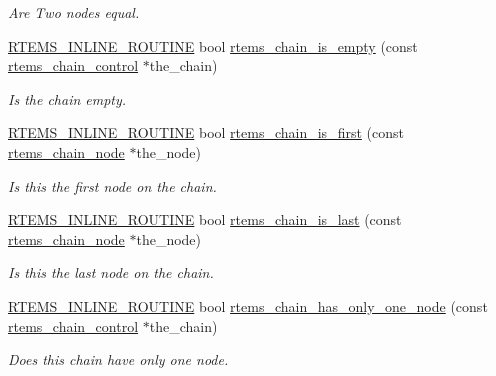\begin{DoxyCompactItemize}
\begin{DoxyCompactList}\small\item\em Are Two nodes equal. \end{DoxyCompactList}\item 
\mbox{\hyperlink{group__RTEMSScoreBaseDefs_gac216239df231d5dbd15e3520b0b9313f}{R\+T\+E\+M\+S\+\_\+\+I\+N\+L\+I\+N\+E\+\_\+\+R\+O\+U\+T\+I\+NE}} bool \mbox{\hyperlink{group__ClassicChains_ga82c37408681422fcdf19b0cdf4d96332}{rtems\+\_\+chain\+\_\+is\+\_\+empty}} (const \mbox{\hyperlink{unionChain__Control}{rtems\+\_\+chain\+\_\+control}} $\ast$the\+\_\+chain)
\begin{DoxyCompactList}\small\item\em Is the chain empty. \end{DoxyCompactList}\item 
\mbox{\hyperlink{group__RTEMSScoreBaseDefs_gac216239df231d5dbd15e3520b0b9313f}{R\+T\+E\+M\+S\+\_\+\+I\+N\+L\+I\+N\+E\+\_\+\+R\+O\+U\+T\+I\+NE}} bool \mbox{\hyperlink{group__ClassicChains_ga9b9b4751cc9266028c9d8f1844779d6a}{rtems\+\_\+chain\+\_\+is\+\_\+first}} (const \mbox{\hyperlink{structChain__Node__struct}{rtems\+\_\+chain\+\_\+node}} $\ast$the\+\_\+node)
\begin{DoxyCompactList}\small\item\em Is this the first node on the chain. \end{DoxyCompactList}\item 
\mbox{\hyperlink{group__RTEMSScoreBaseDefs_gac216239df231d5dbd15e3520b0b9313f}{R\+T\+E\+M\+S\+\_\+\+I\+N\+L\+I\+N\+E\+\_\+\+R\+O\+U\+T\+I\+NE}} bool \mbox{\hyperlink{group__ClassicChains_ga81f52bb1e144d6ef0870b29a85c428cd}{rtems\+\_\+chain\+\_\+is\+\_\+last}} (const \mbox{\hyperlink{structChain__Node__struct}{rtems\+\_\+chain\+\_\+node}} $\ast$the\+\_\+node)
\begin{DoxyCompactList}\small\item\em Is this the last node on the chain. \end{DoxyCompactList}\item 
\mbox{\hyperlink{group__RTEMSScoreBaseDefs_gac216239df231d5dbd15e3520b0b9313f}{R\+T\+E\+M\+S\+\_\+\+I\+N\+L\+I\+N\+E\+\_\+\+R\+O\+U\+T\+I\+NE}} bool \mbox{\hyperlink{group__ClassicChains_ga9a734f3572a98fd660c3914760c0bc73}{rtems\+\_\+chain\+\_\+has\+\_\+only\+\_\+one\+\_\+node}} (const \mbox{\hyperlink{unionChain__Control}{rtems\+\_\+chain\+\_\+control}} $\ast$the\+\_\+chain)
\begin{DoxyCompactList}\small\item\em Does this chain have only one node. \end{DoxyCompactList}\item 

\end{DoxyCompactItemize}
